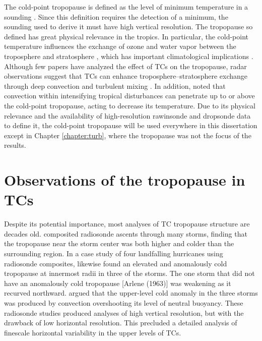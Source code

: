 The cold-point tropopause is defined as the level of minimum temperature in a sounding \citep{HighwoodHoskins1998}.
Since this definition requires the detection of a minimum, the sounding used to derive it must have high vertical resolution.
The tropopause so defined has great physical relevance in the tropics.
In particular, the cold-point temperature influences the exchange of ozone and water vapor between the troposphere and stratosphere \citep{Moteetal1996}, which has important climatological implications \citep{Holtonetal1995}.
Although few papers have analyzed the effect of TCs on the tropopause, radar observations suggest that TCs can enhance troposphere--stratosphere exchange through deep convection and turbulent mixing \citep{Dasetal2008}.
In addition, \citep{Davisetal2014} noted that convection within intensifying tropical disturbances can penetrate up to or above the cold-point tropopause, acting to decrease its temperature.
Due to its physical relevance and the availability of high-resolution rawinsonde and dropsonde data to define it, the cold-point tropopause will be used everywhere in this dissertation except in Chapter \ref{chapter:turb}, where the tropopause was not the focus of the results.

\section{Observations of the tropopause in TCs}
Despite its potential importance, most analyses of TC tropopause structure are decades old.
\cite{JordanJordan1954} composited radiosonde ascents through many storms, finding that the tropopause near the storm center was both higher and colder than the surrounding region.
In a case study of four landfalling hurricanes using radiosonde composites, \cite{Koteswaram1967} likewise found an elevated and anomalously cold tropopause at innermost radii in three of the storms.
The one storm that did not have an anomalously cold tropopause [Arlene (1963)] was weakening as it recurved northward.
\cite{Koteswaram1967} argued that the upper-level cold anomaly in the three storms was produced by convection overshooting its level of neutral buoyancy.
These radiosonde studies produced analyses of high vertical resolution, but with the drawback of low horizontal resolution.
This precluded a detailed analysis of finescale horizontal variability in the upper levels of TCs.

